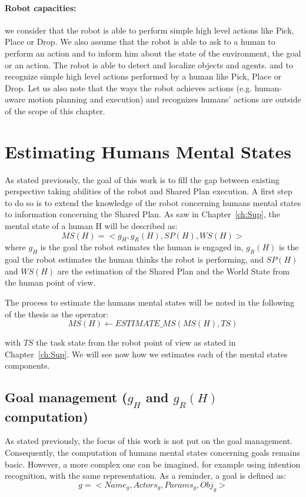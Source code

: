 \documentclass[english,a4paper,11pt,twoside]{StyleThese}
\begin{document}
\paragraph{Robot capacities:} we consider that the robot is able to perform simple high level actions like Pick, Place or Drop. We also assume that the robot is able to ask to a human to perform an action and to inform him about the state of the environment, the goal or an action. The robot is able to detect and localize objects and agents.
and to recognize simple high level actions performed by a human like Pick, Place or Drop. Let us also note that the ways the robot achieves actions (e.g. human-aware motion planning and execution) and recognizes humans’ actions are outside of the scope of this chapter.

\section{Estimating Humans Mental States}

As stated previously, the goal of this work is to fill the gap between existing perspective taking abilities of the robot and Shared Plan execution. A first step to do so is to extend the knowledge of the robot concerning humans mental states to information concerning the Shared Plan. As saw in Chapter~\ref{ch:Sup}, the mental state of a human H will be described as:
$$MS(H) = <g_H, g_R(H), SP(H), WS(H)>$$
where $g_H$ is the goal the robot estimates the human is engaged in, $g_R(H)$ is the goal the robot estimates the human thinks the robot is performing, and $SP(H)$ and $WS(H)$ are the estimation of the Shared Plan and the World State from the human point of view. 

The process to estimate the humans mental states will be noted in the following of the thesis as the operator:
$$MS(H) \leftarrow ESTIMATE\_MS(MS(H), TS)$$

with $TS$ the task state from the robot point of view as stated in Chapter~\ref{ch:Sup}.
We will see now how we estimates each of the mental states components.

\subsection{Goal management ($g_H$ and $g_R(H)$ computation)}

As stated previously, the focus of this work is not put on the goal management. Consequently, the computation of humans mental states concerning goals remains basic. However, a more complex one can be imagined, for example using intention recognition, with the same representation. As a reminder, a goal is defined as:
$$g = <Name_g, Actors_g, Params_g, Obj_g>$$
\end{document}
